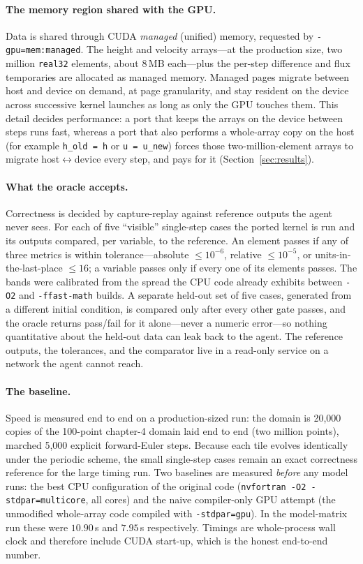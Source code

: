 \documentclass[11pt]{article}
\newcommand{\code}[1]{\texttt{#1}}
\begin{document}
\paragraph{The memory region shared with the GPU.}
Data is shared through CUDA \emph{managed} (unified) memory, requested by
\code{-gpu=mem:managed}. The height and velocity arrays---at the production size,
two million \code{real32} elements, about $8$\,MB each---plus the per-step
difference and flux temporaries are allocated as managed memory. Managed pages
migrate between host and device on demand, at page granularity, and stay
resident on the device across successive kernel launches as long as only the GPU
touches them. This detail decides performance: a port that keeps the arrays on
the device between steps runs fast, whereas a port that also performs a
whole-array copy on the host (for example \code{h\_old = h} or \code{u = u\_new})
forces those two-million-element arrays to migrate host$\leftrightarrow$device
every step, and pays for it (Section~\ref{sec:results}).

\paragraph{What the oracle accepts.}
Correctness is decided by capture-replay against reference outputs the agent
never sees. For each of five ``visible'' single-step cases the ported kernel is
run and its outputs compared, per variable, to the reference. An element passes
if any of three metrics is within tolerance---absolute
$\le 10^{-6}$, relative $\le 10^{-5}$, or units-in-the-last-place
$\le 16$; a variable passes only if every one of its elements passes. The bands
were calibrated from the spread the CPU code already exhibits between
\code{-O2} and \code{-ffast-math} builds. A separate held-out set of five cases,
generated from a different initial condition, is compared only after every other
gate passes, and the oracle returns pass/fail for it alone---never a numeric
error---so nothing quantitative about the held-out data can leak back to the
agent. The reference outputs, the tolerances, and the comparator live in a
read-only service on a network the agent cannot reach.

\paragraph{The baseline.}
Speed is measured end to end on a production-sized run: the domain is 20{,}000
copies of the 100-point chapter-4 domain laid end to end (two million points),
marched 5{,}000 explicit forward-Euler steps. Because each tile evolves
identically under the periodic scheme, the small single-step cases remain an
exact correctness reference for the large timing run. Two baselines are measured
\emph{before} any model runs: the best CPU configuration of the original
code (\code{nvfortran -O2 -stdpar=multicore}, all cores) and the naive
compiler-only GPU attempt (the unmodified whole-array code compiled with
\code{-stdpar=gpu}). In the model-matrix run these were $10.90$\,s and
$7.95$\,s respectively. Timings are whole-process wall clock and therefore
include CUDA start-up, which is the honest end-to-end number.
\end{document}
